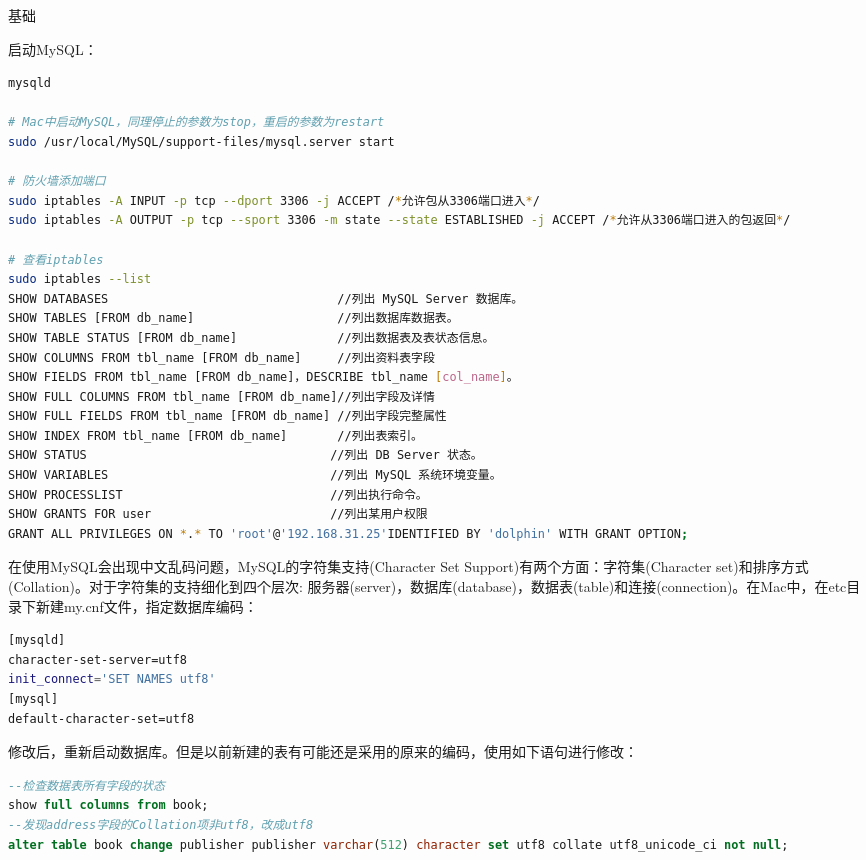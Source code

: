 \documentclass[12pt]{book}
\makeatletter
\numberwithin{dummy}{section}
\theoremstyle{ocrenumbox}
\theoremstyle{blacknumex}
\theoremstyle{blacknumbox}
\theoremstyle{ocrenum}
\renewcommand{\subsection}{\@startsection {subsection}{2}{\z@}
	{-3ex \@plus -0.1ex \@minus -.4ex}
	{0.5ex \@plus.2ex }
	{\normalfont\sffamily\bfseries}}
\makeatother
\begin{document}
\subsection{基础}

启动MySQL：

\begin{lstlisting}[language=Bash]
mysqld

# Mac中启动MySQL，同理停止的参数为stop，重启的参数为restart
sudo /usr/local/MySQL/support-files/mysql.server start

# 防火墙添加端口
sudo iptables -A INPUT -p tcp --dport 3306 -j ACCEPT /*允许包从3306端口进入*/
sudo iptables -A OUTPUT -p tcp --sport 3306 -m state --state ESTABLISHED -j ACCEPT /*允许从3306端口进入的包返回*/

# 查看iptables
sudo iptables --list
SHOW DATABASES                                //列出 MySQL Server 数据库。
SHOW TABLES [FROM db_name]                    //列出数据库数据表。
SHOW TABLE STATUS [FROM db_name]              //列出数据表及表状态信息。
SHOW COLUMNS FROM tbl_name [FROM db_name]     //列出资料表字段
SHOW FIELDS FROM tbl_name [FROM db_name]，DESCRIBE tbl_name [col_name]。
SHOW FULL COLUMNS FROM tbl_name [FROM db_name]//列出字段及详情
SHOW FULL FIELDS FROM tbl_name [FROM db_name] //列出字段完整属性
SHOW INDEX FROM tbl_name [FROM db_name]       //列出表索引。
SHOW STATUS                                  //列出 DB Server 状态。
SHOW VARIABLES                               //列出 MySQL 系统环境变量。
SHOW PROCESSLIST                             //列出执行命令。
SHOW GRANTS FOR user                         //列出某用户权限
GRANT ALL PRIVILEGES ON *.* TO 'root'@'192.168.31.25'IDENTIFIED BY 'dolphin' WITH GRANT OPTION;
\end{lstlisting}

在使用MySQL会出现中文乱码问题，MySQL的字符集支持(Character Set Support)有两个方面：字符集(Character set)和排序方式(Collation)。对于字符集的支持细化到四个层次: 服务器(server)，数据库(database)，数据表(table)和连接(connection)。在Mac中，在etc目录下新建my.cnf文件，指定数据库编码：

\begin{lstlisting}[language=Bash]
[mysqld]
character-set-server=utf8
init_connect='SET NAMES utf8'
[mysql]
default-character-set=utf8
\end{lstlisting}

修改后，重新启动数据库。但是以前新建的表有可能还是采用的原来的编码，使用如下语句进行修改：

\begin{lstlisting}[language=SQL]
--检查数据表所有字段的状态	
show full columns from book; 
--发现address字段的Collation项非utf8，改成utf8
alter table book change publisher publisher varchar(512) character set utf8 collate utf8_unicode_ci not null;
\end{lstlisting}
\end{document}
